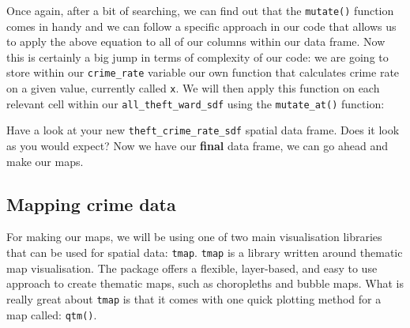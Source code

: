 \documentclass[
]{book}
\newenvironment{Shaded}{\begin{snugshade}}{\end{snugshade}}
\newcommand{\AttributeTok}[1]{\textcolor[rgb]{0.77,0.63,0.00}{#1}}
\newcommand{\CommentTok}[1]{\textcolor[rgb]{0.56,0.35,0.01}{\textit{#1}}}
\newcommand{\ConstantTok}[1]{\textcolor[rgb]{0.00,0.00,0.00}{#1}}
\newcommand{\ControlFlowTok}[1]{\textcolor[rgb]{0.13,0.29,0.53}{\textbf{#1}}}
\newcommand{\DecValTok}[1]{\textcolor[rgb]{0.00,0.00,0.81}{#1}}
\newcommand{\FunctionTok}[1]{\textcolor[rgb]{0.00,0.00,0.00}{#1}}
\newcommand{\NormalTok}[1]{#1}
\newcommand{\OtherTok}[1]{\textcolor[rgb]{0.56,0.35,0.01}{#1}}
\newcommand{\SpecialCharTok}[1]{\textcolor[rgb]{0.00,0.00,0.00}{#1}}
\begin{document}
Once again, after a bit of searching, we can find out that the \texttt{mutate()} function comes in handy and we can follow a specific approach in our code that allows us to apply the above equation to all of our columns within our data frame. Now this is certainly a big jump in terms of complexity of our code: we are going to store within our \texttt{crime\_rate} variable our own function that calculates crime rate on a given value, currently called \texttt{x}. We will then apply this function on each relevant cell within our \texttt{all\_theft\_ward\_sdf} using the \texttt{mutate\_at()} function:

\begin{Shaded}
\end{Shaded}

Have a look at your new \texttt{theft\_crime\_rate\_sdf} spatial data frame. Does it look as you would expect? Now we have our \textbf{final} data frame, we can go ahead and make our maps.

\hypertarget{mapping-crime-data}{%
\subsection{Mapping crime data}\label{mapping-crime-data}}

For making our maps, we will be using one of two main visualisation libraries that can be used for spatial data: \texttt{tmap}. \texttt{tmap} is a library written around thematic map visualisation. The package offers a flexible, layer-based, and easy to use approach to create thematic maps, such as choropleths and bubble maps. What is really great about \texttt{tmap} is that it comes with one quick plotting method for a map called: \texttt{qtm()}.
\end{document}
